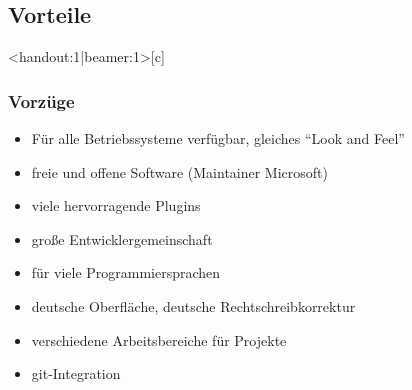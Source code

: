 \documentclass[t, %
							xcolor=dvipsnames,%
							hyperref={bookmarks,colorlinks},%
							]%
							{beamer}
\begin{document}
    \subsection{Vorteile}
		\label{sub:Vorteile}
		\begin{frame}<handout:1|beamer:1>[c]
			\frametitle{Vorzüge}
			\begin{itemize}
				\item Für alle Betriebssysteme verfügbar, gleiches \enquote{Look and Feel}
				\item freie und offene Software (Maintainer Microsoft)
				\item viele hervorragende Plugins
				\item große Entwicklergemeinschaft
				\item für viele Programmiersprachen
				\item deutsche Oberfläche, deutsche Rechtschreibkorrektur
				\item verschiedene Arbeitsbereiche für Projekte
				\item git-Integration \cite{vscodium}
			\end{itemize}
		\end{frame}
		
\end{document}
